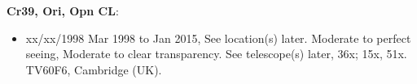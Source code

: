 {\bf Cr39, Ori, Opn CL}:
\begin{itemize}
\item xx/xx/1998 Mar 1998 to Jan 2015, See location(s) later. Moderate to perfect seeing, Moderate to clear transparency. See telescope(s) later, 36x; 15x, 51x. TV60F6, Cambridge (UK).
\end{itemize}
